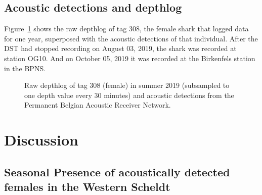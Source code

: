 \documentclass[
  authoryear,
  review,
  3p]{elsarticle}
\begin{document}
\hypertarget{acoustic-detections-and-depthlog}{%
\subsection{Acoustic detections and
depthlog}\label{acoustic-detections-and-depthlog}}

Figure~\ref{fig-adst308} shows the raw depthlog of tag 308, the female
shark that logged data for one year, superposed with the acoustic
detections of that individual. After the DST had stopped recording on
August 03, 2019, the shark was recorded at station OG10. And on October
05, 2019 it was recorded at the Birkenfels station in the BPNS.

\begin{figure}

\begin{minipage}[t]{\linewidth}

{\centering 


\caption{\label{fig-adst308}Raw depthlog of tag 308 (female) in summer
2019 (subsampled to one depth value every 30 minutes) and acoustic
detections from the Permanent Belgian Acoustic Receiver Network.}

}

\end{minipage}%

\end{figure}

\hypertarget{discussion}{%
\section{Discussion}\label{discussion}}

\hypertarget{sec-disc-seasonalpresencefemales}{%
\subsection{Seasonal Presence of acoustically detected females in the
Western Scheldt}\label{sec-disc-seasonalpresencefemales}}
\end{document}
